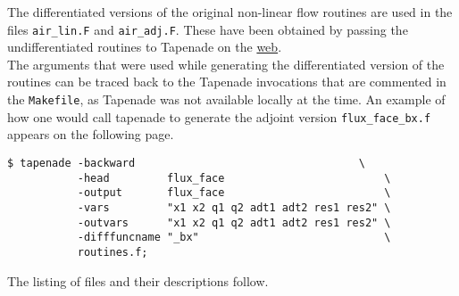 \noindent The differentiated versions of the original non-linear flow routines are used in the files \texttt{air\_lin.F} and \texttt{air\_adj.F}. These have been obtained by passing the undifferentiated routines to Tapenade on the \href{http://www-tapenade.inria.fr:8080/tapenade/index.jsp}{web}. \\

\noindent The arguments that were used while generating the differentiated version of the routines can be traced back to the Tapenade invocations that are commented in the \texttt{Makefile}, as Tapenade was not available locally at the time. An example of how one would call tapenade to generate the adjoint version \texttt{flux\_face\_bx.f} appears on the following page. 
\clearpage
\begin{lstlisting}[language=mybash]
$ tapenade -backward                                   \
		   -head         flux_face                         \
		   -output       flux_face                         \
		   -vars         "x1 x2 q1 q2 adt1 adt2 res1 res2" \
		   -outvars      "x1 x2 q1 q2 adt1 adt2 res1 res2" \
		   -difffuncname "_bx"                             \
		   routines.f;
\end{lstlisting}
\noindent The listing of files and their descriptions follow.\\

